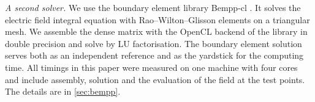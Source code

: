 \emph{A second solver.} We use the boundary element library Bempp-cl \cite{betcke2021,scroggs2017}. It solves the electric field integral equation with Rao--Wilton--Glisson elements \cite{rao1982} on a triangular mesh. We assemble the dense matrix with the OpenCL backend of the library in double precision and solve by LU factorisation. The boundary element solution serves both as an independent reference and as the yardstick for the computing time. All timings in this paper were measured on one machine with four cores and include assembly, solution and the evaluation of the field at the test points. The details are in \ref{sec:bempp}.
